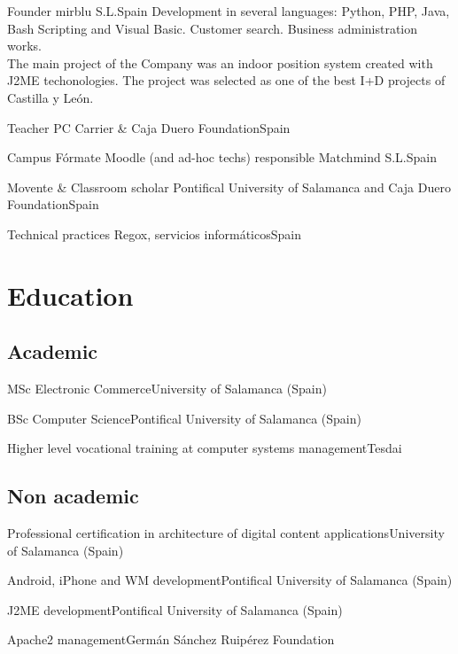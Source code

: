 \documentclass[12pt, a4paper, sans]{moderncv}
\begin{document}
{Founder}
{mirblu S.L.}{Spain}{}
{Development in several languages: Python, PHP, Java, Bash Scripting and Visual
Basic. Customer search. Business administration works.\\The main project of the
Company was an indoor position system created with J2ME techonologies. The
project was selected as one of the best I+D projects of Castilla y León.\\}

{Teacher}
{PC Carrier \& Caja Duero Foundation}{Spain}{}{}

{Campus Fórmate Moodle (and ad-hoc techs) responsible}
{Matchmind S.L.}{Spain}{}{}

{Movente \& Classroom scholar}
{Pontifical University of Salamanca and Caja Duero Foundation}{Spain}{}{}

{Technical practices}
{Regox, servicios informáticos}{Spain}{}{}


%
%

\section{Education}
\subsection{Academic}
{MSc Electronic Commerce}{University of Salamanca (Spain)}{}{}{}

{BSc Computer Science}{Pontifical University of Salamanca (Spain)}{}{}{}

{Higher level vocational training at computer systems management}{Tesdai}{}{}{}

\subsection{Non academic}
{Professional certification in architecture of digital content applications}{University of Salamanca (Spain)}{}{}{}

{Android, iPhone and WM development}{Pontifical University of Salamanca (Spain)}{}{}{}

{J2ME development}{Pontifical University of Salamanca (Spain)}{}{}{}

{Apache2 management}{Germán Sánchez Ruipérez Foundation}{}{}{}
\end{document}
